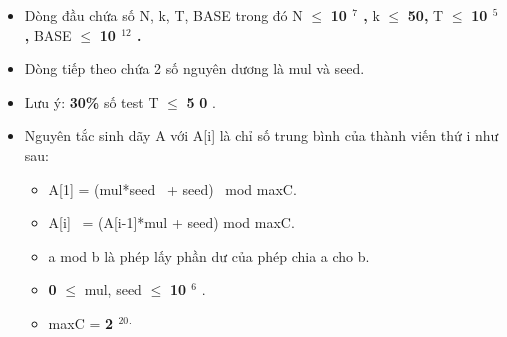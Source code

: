 \begin{itemize}
	\item      Dòng đầu chứa số N, k, T, BASE trong đó N  $\le$      \textbf{      10      $^       7      $      ,     }     k  $\le$      \textbf{      50,     }     T  $\le$      \textbf{      10      $^       5      $      ,     }     BASE  $\le$      \textbf{      10      $^       12      $      .     }
	\item      Dòng tiếp theo chứa 2 số nguyên dương là mul và seed.    
	\item      Lưu ý:     \textbf{      30\%     }     số test T  $\le$      \textbf{      5     }\textbf{      0     }     .    
	\item      Nguyên tắc sinh dãy A với A[i] là chỉ số trung bình của thành viến thứ i như sau:    
\begin{itemize}
	\item        A[1] = (mul*seed  + seed)  mod maxC.      
	\item        A[i]  = (A[i-1]*mul + seed) mod maxC.      
	\item        a mod b là phép lấy phần dư của phép chia a cho b.      
	\item \textbf{        0       }        $\le$  mul, seed  $\le$        \textbf{        10        $^         6        $}       .      
	\item        maxC =       \textbf{\textbf{         2        }$^         20        $$^         .        $}
\end{itemize}
\end{itemize}



\